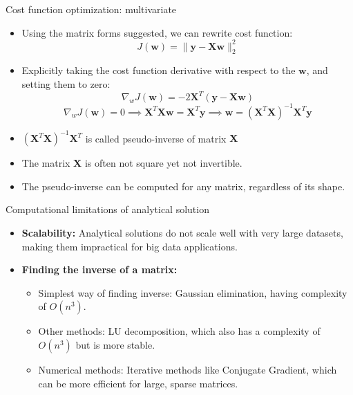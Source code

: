\documentclass[serif, aspectratio=169]{beamer}
\begin{document}
\begin{frame}{Cost function optimization: multivariate}

    \begin{itemize}
        \item Using the matrix forms suggested, we can rewrite cost function:
        \[
        J(\mathbf{w}) = \| \mathbf{y} - \mathbf{Xw} \|_2^2
        \]
        \item Explicitly taking the cost function derivative with respect to the \( \mathbf{w} \), and setting them to zero:
        \[
        \nabla_w J(\mathbf{w}) = -2 \mathbf{X}^T \left( \mathbf{y} - \mathbf{Xw} \right)
        \]
        \[
        \nabla_w J(\mathbf{w}) = 0 \implies \mathbf{X}^T \mathbf{Xw} = \mathbf{X}^T \mathbf{y} \implies \mathbf{w} = \left( \mathbf{X}^T \mathbf{X} \right)^{-1} \mathbf{X}^T \mathbf{y}
        \]
    \end{itemize}


    \begin{itemize}
        \item \( \left(\mathbf{X}^T \mathbf{X} \right)^{-1} \mathbf{X}^T \) is called pseudo-inverse of matrix \( \mathbf{X} \)
        \item The matrix \( \mathbf{X} \) is often not square yet not invertible. \item The pseudo-inverse can be computed for any matrix, regardless of its shape.
    \end{itemize}
\end{frame}

\begin{frame}{Computational limitations of analytical solution}
    \begin{itemize}
        \item \textbf{Scalability:} Analytical solutions do not scale well with very large datasets, making them impractical for big data applications.
        \item \textbf{Finding the inverse of a matrix:}
        \begin{itemize}
            \item Simplest way of finding inverse: Gaussian elimination, having complexity of \(O(n^3)\).
            \item Other methods: LU decomposition, which also has a complexity of \(O(n^3)\) but is more stable.
            \item Numerical methods: Iterative methods like Conjugate Gradient, which can be more efficient for large, sparse matrices.
        \end{itemize}
    \end{itemize}
\end{frame}
\end{document}
